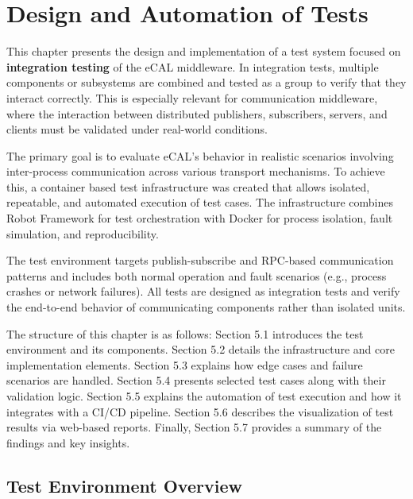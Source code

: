 \clearpage
\section{Design and Automation of Tests}

This chapter presents the design and implementation of a test system focused on \textbf{integration testing} of the eCAL middleware. In integration tests, multiple components or subsystems are combined and tested as a group to verify that they interact correctly. This is especially relevant for communication middleware, where the interaction between distributed publishers, subscribers, servers, and clients must be validated under real-world conditions.

\vspace{0.9em}
The primary goal is to evaluate eCAL’s behavior in realistic scenarios involving inter-process communication across various transport mechanisms. To achieve this, a container based test infrastructure was created that allows isolated, repeatable, and automated execution of test cases. The infrastructure combines Robot Framework for test orchestration with Docker for process isolation, fault simulation, and reproducibility.

\vspace{0.9em}
The test environment targets publish-subscribe and RPC-based communication patterns and includes both normal operation and fault scenarios (e.g., process crashes or network failures). All tests are designed as integration tests and verify the end-to-end behavior of communicating components rather than isolated units.

\vspace{0.9em}
The structure of this chapter is as follows: Section 5.1 introduces the test environment and its components. Section 5.2 details the infrastructure and core implementation elements. Section 5.3 explains how edge cases and failure scenarios are handled. Section 5.4 presents selected test cases along with their validation logic. Section 5.5 explains the automation of test execution and how it integrates with a CI/CD pipeline. Section 5.6 describes the visualization of test results via web-based reports. Finally, Section 5.7 provides a summary of the findings and key insights.

\subsection{Test Environment Overview}

